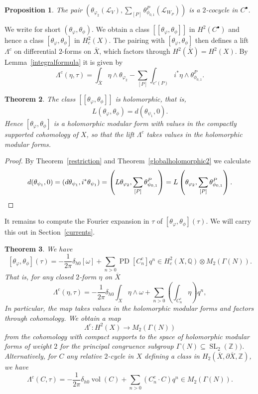 \documentclass[12pt,leqno]{amsart}
\numberwithin{equation}{section}
\theoremstyle{plain}
\newtheorem{theorem}{Theorem}[section]
\newtheorem{proposition}[theorem]{Proposition}
\theoremstyle{definition}
\theoremstyle{remark}
\newcommand{\Q}{\mathbb{Q}}
\newcommand{\Z}{\mathbb{Z}}
\newcommand{\G}{\Gamma}
\newcommand{\calL}{\mathcal{L}}
\newcommand{\vol}{\operatorname{vol}}
\newcommand{\SL}{\operatorname{SL}}
\newcommand{\PD}{\operatorname{PD}}
\begin{document}
\begin{proposition}
The pair $(\theta_{\varphi_2}(\calL_V), \sum_{[P]} \theta^P_{\phi_{0,1}}(\calL_{W_P}))$ is a $2$-cocycle in $C^{\bullet}$.
\end{proposition}

We write for short $(\theta_{\varphi},\theta_{\phi})$. We obtain a class $[[\theta_{\varphi},\theta_{\phi}]]$ in $H^2(C^{\bullet})$ and hence a class $[\theta_{\varphi},\theta_{\phi}]$ in $H^2_c(X)$. The pairing with $[\theta_{\varphi}, \theta_{\phi}]$ then defines a lift $\Lambda^c$ on differential $2$-forms on $\overline{X}$, which factors through $H^2(\overline{X}) = H^2(X)$. By Lemma~\ref{integralformula} it is given by 
\[
\Lambda^c(\eta,\tau) =  \int_{\overline{X}} \eta \wedge \theta_{\varphi_2} - \sum_{[P]}  \int_{e'(P)} i^*\eta \wedge \theta^P_{\phi_{0,1}}.
\]

\begin{theorem}\label{La^c-hol}
The class $[[\theta_{\varphi},  \theta_{\phi}]]$ is holomorphic, that is, 
\[
L\left(\theta_{\varphi}, \theta_{\phi}\right) = d(\theta_{\psi_1},0).
\]
Hence $[\theta_{\varphi}, \theta_{\phi}]$ is a holomorphic modular form with values in the compactly supported cohomology of $X$, so that the lift $\Lambda^c$ takes values in the holomorphic modular forms.
\end{theorem}
\begin{proof}
By Theorem~\ref{restriction} and Theorem~\ref{globalholomorphic2} we calculate 
\[
d(\theta_{\psi_1},0) = (d\theta_{\psi_1}, i^{\ast} \theta_{\psi_1}) = \left(L \theta_{\varphi_2},  \sum_{[P]}\theta^P_{\psi_{0,1}}\right) =L\left(\theta_{\varphi_2}, \sum_{[P]} \theta^P_{\phi_{0,1}}\right). \qedhere
\]
\end{proof}

It remains to compute the Fourier expansion in $\tau$ of $[\theta_{\varphi}, \theta_{\phi}](\tau)$. We will carry this out in Section~\ref{currents}. 

\begin{theorem}\label{FM-main-th}
We have 
\[
[\theta_{\varphi}, \theta_{\phi}](\tau) =  -\frac{1}{2\pi}\delta_{h0} [\omega] + \sum_{n>0} \PD[C^c_n] q^n \in H_c^2(X,\Q) \otimes M_2(\G(N)).
\]
That is, for any closed $2$-form $\eta$ on $\overline{X}$
\[
\Lambda^c(\eta,\tau) = -\frac{1}{2\pi}\delta_{h0} \int_X \eta \wedge \omega + \sum_{n>0} \left( \int_{C^c_n} \eta \right)q^n,
\]
In particular, the map takes values in the holomorphic modular forms and factors through cohomology. We obtain a map
\begin{equation}
\Lambda^c: H^{2}(X) \to M_{2}(\G(N))
\end{equation}
from the cohomology with compact supports to the space of holomorphic modular forms of weight $2$ for the principal congruence subgroup $\G(N) \subseteq \SL_2(\Z))$.
Alternatively, for $C$ any relative $2$-cycle in $X$ defining a class in $H_2(\overline{X},\partial \overline{X},\Z)$, we have
\[
\Lambda^c(C,\tau) = -\frac{1}{2\pi}\delta_{h0} \vol(C) + \sum_{n>0} ( C^c_n \cdot C ) q^n \in M_2(\G(N)).
\]
\end{theorem}
\end{document}

